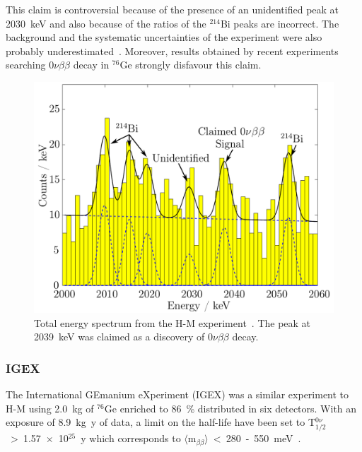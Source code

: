 \documentclass[main.tex]{subfiles}
\begin{document}
\bigskip


\NI This claim is controversial because of the presence of an unidentified peak at 2030~keV and also because of the ratios of the $^{\text{214}}$Bi peaks are incorrect. The background and the systematic uncertainties of the experiment were also probably underestimated~\cite{HeidelbergMoscow3}. Moreover, results obtained by recent experiments searching 0$\nu\beta\beta$ decay in $^{\text{76}}$Ge strongly disfavour this claim.



\begin{figure}[h!]
\begin{center}
\includegraphics[scale=0.3]{pictures/Chap2/H-M-experiment-claim.png}
\caption{Total energy spectrum from the H-M experiment~\cite{HeidelbergMoscow1}. The peak at 2039~keV was claimed as a discovery of 0$\nu\beta\beta$ decay.}
\label{HMexperimentClaim}
\end{center}
\end{figure}


\FloatBarrier

\subsubsection{IGEX}


\NI The International GEmanium eXperiment (IGEX) was a similar experiment to H-M using 2.0~kg of $^{\text{76}}$Ge enriched to 86~\% distributed in six detectors. With an exposure of 8.9~kg~y of data, a limit on the half-life have been set to T$_{\text{1/2}}^{0\nu}$~>~1.57~$\times$~10$^{\text{25}}$~y which corresponds to $\langle \text{m}_{\beta\beta} \rangle$~<~280~-~550~meV~\cite{IGEX}.
\end{document}
